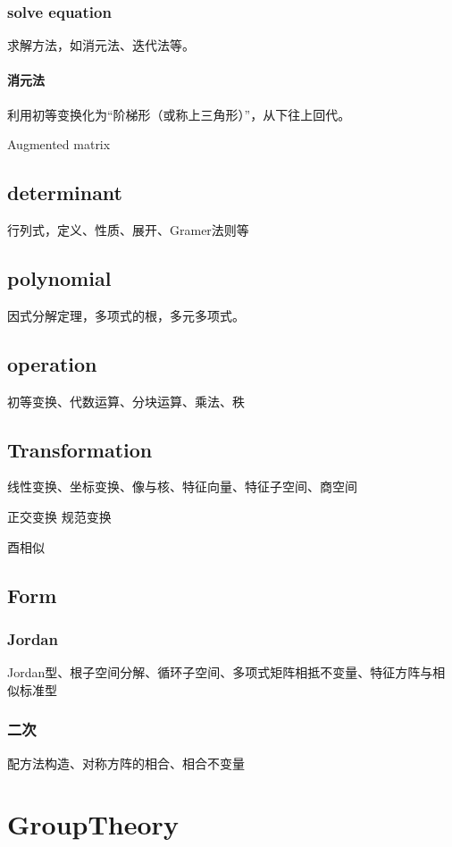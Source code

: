 \documentclass[UTF8]{../09-Mathematics}
\begin{document}
\subsection{solve equation}
求解方法，如消元法、迭代法等。

\subsubsection{消元法}
利用初等变换化为“阶梯形（或称上三角形）”，从下往上回代。


Augmented matrix

\section{determinant}
行列式，定义、性质、展开、Gramer法则等

\section{polynomial}
因式分解定理，多项式的根，多元多项式。


\section{operation}
初等变换、代数运算、分块运算、乘法、秩

\section{Transformation}
线性变换、坐标变换、像与核、特征向量、特征子空间、商空间

正交变换
规范变换

酉相似
\section{Form}

\subsection{Jordan}

Jordan型、根子空间分解、循环子空间、多项式矩阵相抵不变量、特征方阵与相似标准型

\subsection{二次}
配方法构造、对称方阵的相合、相合不变量




\chapter{GroupTheory}
\end{document}
